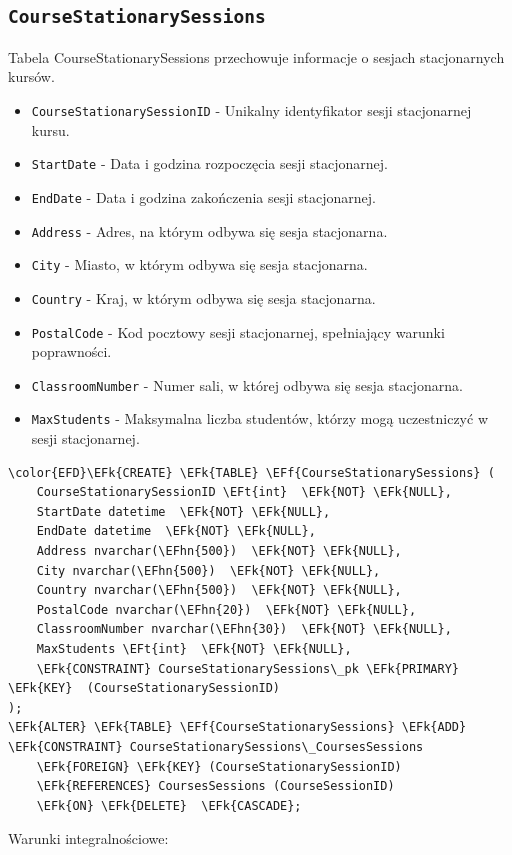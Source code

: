 \documentclass[11pt]{article}
\newcommand{\EFk}[1]{\textcolor{EFk}{\textbf{#1}}} %
\newcommand{\EFf}[1]{\textcolor{EFf}{#1}} %
\newcommand{\EFt}[1]{\textcolor{EFt}{\textbf{#1}}} %
\newcommand{\EFhn}[1]{\textcolor{EFhn}{#1}} %
\begin{document}
\subsection{\texttt{CourseStationarySessions}}
\label{sec:org71a0785}
Tabela CourseStationarySessions przechowuje informacje o sesjach stacjonarnych kursów.
\begin{itemize}
\item \texttt{CourseStationarySessionID} - Unikalny identyfikator sesji stacjonarnej kursu.
\item \texttt{StartDate} - Data i godzina rozpoczęcia sesji stacjonarnej.
\item \texttt{EndDate} - Data i godzina zakończenia sesji stacjonarnej.
\item \texttt{Address} - Adres, na którym odbywa się sesja stacjonarna.
\item \texttt{City} - Miasto, w którym odbywa się sesja stacjonarna.
\item \texttt{Country} - Kraj, w którym odbywa się sesja stacjonarna.
\item \texttt{PostalCode} - Kod pocztowy sesji stacjonarnej, spełniający warunki poprawności.
\item \texttt{ClassroomNumber} - Numer sali, w której odbywa się sesja stacjonarna.
\item \texttt{MaxStudents} - Maksymalna liczba studentów, którzy mogą uczestniczyć w sesji stacjonarnej.
\end{itemize}
\begin{Code}
\begin{Verbatim}
\color{EFD}\EFk{CREATE} \EFk{TABLE} \EFf{CourseStationarySessions} (
    CourseStationarySessionID \EFt{int}  \EFk{NOT} \EFk{NULL},
    StartDate datetime  \EFk{NOT} \EFk{NULL},
    EndDate datetime  \EFk{NOT} \EFk{NULL},
    Address nvarchar(\EFhn{500})  \EFk{NOT} \EFk{NULL},
    City nvarchar(\EFhn{500})  \EFk{NOT} \EFk{NULL},
    Country nvarchar(\EFhn{500})  \EFk{NOT} \EFk{NULL},
    PostalCode nvarchar(\EFhn{20})  \EFk{NOT} \EFk{NULL},
    ClassroomNumber nvarchar(\EFhn{30})  \EFk{NOT} \EFk{NULL},
    MaxStudents \EFt{int}  \EFk{NOT} \EFk{NULL},
    \EFk{CONSTRAINT} CourseStationarySessions\_pk \EFk{PRIMARY} \EFk{KEY}  (CourseStationarySessionID)
);
\EFk{ALTER} \EFk{TABLE} \EFf{CourseStationarySessions} \EFk{ADD} \EFk{CONSTRAINT} CourseStationarySessions\_CoursesSessions
    \EFk{FOREIGN} \EFk{KEY} (CourseStationarySessionID)
    \EFk{REFERENCES} CoursesSessions (CourseSessionID)
    \EFk{ON} \EFk{DELETE}  \EFk{CASCADE};
\end{Verbatim}
\end{Code}
Warunki integralnościowe:
\end{document}
